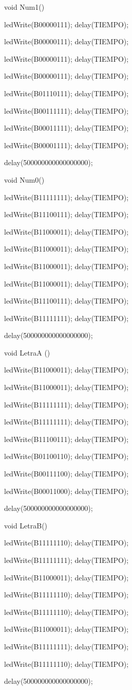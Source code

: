 \documentclass{article}
\begin{document}
void Num1(){ 
   
   ledWrite(B00000111); delay(TIEMPO);
   
   ledWrite(B00000111); delay(TIEMPO);
   
   ledWrite(B00000111); delay(TIEMPO);
   
   ledWrite(B00000111); delay(TIEMPO);
   
   ledWrite(B01110111); delay(TIEMPO);
   
   ledWrite(B00111111); delay(TIEMPO);
   
   ledWrite(B00011111); delay(TIEMPO);
   
   ledWrite(B00001111); delay(TIEMPO);
  
  delay(500000000000000000);}

void Num0(){
   
   ledWrite(B11111111); delay(TIEMPO);
   
   ledWrite(B11100111); delay(TIEMPO);
   
   ledWrite(B11000011); delay(TIEMPO);
   
   ledWrite(B11000011); delay(TIEMPO);
   
   ledWrite(B11000011); delay(TIEMPO);
   
   ledWrite(B11000011); delay(TIEMPO);
   
   ledWrite(B11100111); delay(TIEMPO);
   
   ledWrite(B11111111); delay(TIEMPO);
  
  delay(500000000000000000);}
  
void LetraA (){
   
   ledWrite(B11000011); delay(TIEMPO);
   
   ledWrite(B11000011); delay(TIEMPO);
   
   ledWrite(B11111111); delay(TIEMPO);
   
   ledWrite(B11111111); delay(TIEMPO);
   
   ledWrite(B11100111); delay(TIEMPO);
   
   ledWrite(B01100110); delay(TIEMPO);
   
   ledWrite(B00111100); delay(TIEMPO);
   
   ledWrite(B00011000); delay(TIEMPO);
  
  delay(500000000000000000);}

void LetraB(){
     
   ledWrite(B11111110); delay(TIEMPO);
   
   ledWrite(B11111111); delay(TIEMPO);
   
   ledWrite(B11000011); delay(TIEMPO);
   
   ledWrite(B11111110); delay(TIEMPO);
   
   ledWrite(B11111110); delay(TIEMPO);
   
   ledWrite(B11000011); delay(TIEMPO);
   
   ledWrite(B11111111); delay(TIEMPO);
   
   ledWrite(B11111110); delay(TIEMPO);
  
  delay(500000000000000000);}
\end{document}
